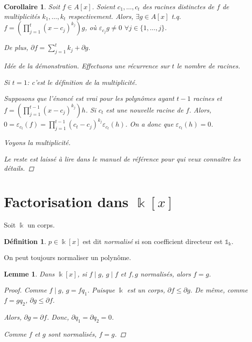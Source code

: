 \documentclass{report}
\newtheorem*{lem}{Lemme}
\newtheorem*{coro}{Corollaire}
\theoremstyle{definition}
\newtheorem*{dfn}{D\'efinition}
\theoremstyle{remark}
\newenvironment*{subproof}[1][D\'emonstration]
{
\begin{proof}[#1]

}
{
\renewcommand{\qedsymbol}{$\blacksquare$}
\end{proof}
\renewcommand{\qedsymbol}{$\square$}
}
\def\lte{\leqslant}
\def\id{\mathds{1}}
\begin{document}
	\begin{coro}
		Soit $f\in A[x]$. Soient $c_1,\dots,c_t$ des racines distinctes de $f$ de multiplicit\'es $k_1,\dots,k_t$ respectivement. Alors, $\exists g\in A[x]$ t.q. $f = \left( \prod_{j=1}^{t} (x-c_j)^{k_j} \right)g$, o\`u $\varepsilon_{c_j}g\neq0$ $\forall j\in\{1,\dots,j\}$.

		De plus, $\partial f=\sum_{j=1}^{t}k_j+\partial g$.
		\begin{subproof}[Id\'ee de la d\'emonstration]
			Effectuons une r\'ecurrence sur $t$ le nombre de racines.

			Si $t=1$: c'est le d\'efinition de la multiplicit\'e.

			Supposons que l'\'enonc\'e est vrai pour les polyn\^omes ayant $t-1$ racines et $f = \left( \prod_{j=1}^{t-1} (x-c_j)^{k_j} \right) h$. Si $c_t$ est une nouvelle racine de $f$. Alors, $0 = \varepsilon_{c_t}(f) = \prod_{j=1}^{t-1} (c_t-c_j)^{k_j} \varepsilon_{c_t}(h)$. On a donc que $\varepsilon_{c_t}(h)=0$.

			Voyons la multiplicit\'e.

			Le reste est laiss\'e \`a lire dans le manuel de r\'ef\'erence pour qui veux conna\^itre les d\'etails.
		\end{subproof}
	\end{coro}

	\section{Factorisation dans $\Bbbk[x]$}
	Soit $\Bbbk$ un corps.

	\begin{dfn}
		$p\in\Bbbk[x]$ est dit \emph{normalis\'e} si son coefficient directeur est $\id_\Bbbk$.

		On peut toujours normaliser un polyn\^ome.
	\end{dfn}

	\begin{lem}
		Dans $\Bbbk[x]$, si $f\mid g$, $g\mid f$ et $f,g$ normalis\'es, alors $f=g$.
		\begin{proof}
			Comme $f\mid g$, $g=fq_1$. Puisque $\Bbbk$ est un corps, $\partial f\lte\partial g$. De m\^eme, comme $f=gq_2$, $\partial g\lte\partial f$.

			Alors, $\partial g=\partial f$. Donc, $\partial q_1=\partial q_2=0$.

			Comme $f$ et $g$ sont normalis\'es, $f=g$.
		\end{proof}
	\end{lem}
\end{document}
